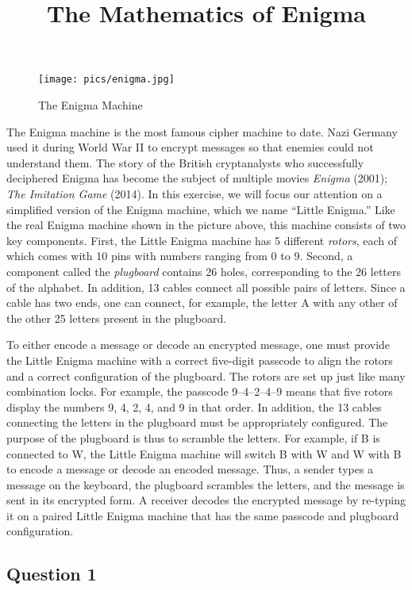 \documentclass[]{article}
\title{The Mathematics of Enigma}
\author{}
\date{}
\begin{document}
\maketitle


\begin{figure}[htbp]
\centering
\texttt{[image: pics/enigma.jpg]}
\caption{The Enigma Machine}
\end{figure}

The Enigma machine is the most famous cipher machine to date. Nazi
Germany used it during World War II to encrypt messages so that enemies
could not understand them. The story of the British cryptanalysts who
successfully deciphered Enigma has become the subject of multiple movies
\emph{Enigma} (2001); \emph{The Imitation Game} (2014). In this
exercise, we will focus our attention on a simplified version of the
Enigma machine, which we name ``Little Enigma.'' Like the real Enigma
machine shown in the picture above, this machine consists of two key
components. First, the Little Enigma machine has 5 different
\emph{rotors}, each of which comes with 10 pins with numbers ranging
from 0 to 9. Second, a component called the \emph{plugboard} contains 26
holes, corresponding to the 26 letters of the alphabet. In addition, 13
cables connect all possible pairs of letters. Since a cable has two
ends, one can connect, for example, the letter A with any other of the
other 25 letters present in the plugboard.

To either encode a message or decode an encrypted message, one must
provide the Little Enigma machine with a correct five-digit passcode to
align the rotors and a correct configuration of the plugboard. The
rotors are set up just like many combination locks. For example, the
passcode 9--4--2--4--9 means that five rotors display the numbers 9, 4,
2, 4, and 9 in that order. In addition, the 13 cables connecting the
letters in the plugboard must be appropriately configured. The purpose
of the plugboard is thus to scramble the letters. For example, if B is
connected to W, the Little Enigma machine will switch B with W and W
with B to encode a message or decode an encoded message. Thus, a sender
types a message on the keyboard, the plugboard scrambles the letters,
and the message is sent in its encrypted form. A receiver decodes the
encrypted message by re-typing it on a paired Little Enigma machine that
has the same passcode and plugboard configuration.

\subsection{Question 1}\label{question-1}
\end{document}
